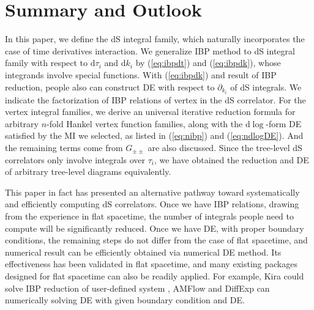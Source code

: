 \documentclass[a4paper,11pt]{article}
\newcommand{\nd}{\mathrm{d}}
\def\eqref#1{(\ref{#1})}
\begin{document}




\section{Summary and Outlook}\label{sec:4}
In this paper, we define the dS integral family, which naturally incorporates the case of time derivatives interaction. We generalize IBP method to dS integral family with respect to $\nd \tau_i$ and $\nd k_i$ by \eqref{eq:ibpdt} and \eqref{eq:ibpdk}, whose integrands involve special functions. With \eqref{eq:ibpdk} and result of IBP reduction,  people also can construct DE with respect to $\partial_{k_i}$ of dS integrals. We indicate  the factorization of IBP relations of vertex in the dS correlator. For the vertex integral families, we derive an universal iterative reduction formula for arbitrary $n$-fold Hankel vertex function families, along with the $\nd \log$-form DE satisfied by the MI we selected, as listed in \eqref{eq:nibp} and \eqref{eq:ndlogDE}. And the remaining terms come from $G_{\pm\pm}$ are also discussed.  Since the tree-level dS correlators only involve integrals over $\tau_i$, we have obtained the reduction and DE of arbitrary tree-level diagrams %
equivalently.

This paper in fact has presented an alternative pathway toward systematically and efficiently computing dS correlators. Once we have IBP relations, drawing from the experience in flat spacetime, the number of integrals people need to compute will be significantly reduced. Once we have DE, with proper boundary conditions, the remaining steps do not differ from the case of flat spacetime, and numerical result can be efficiently obtained via numerical DE method.  Its effectiveness has been validated in flat spacetime, and many existing packages designed for flat spacetime can also be readily applied. For example, Kira could solve IBP reduction of user-defined system \cite{Maierhofer:2018gpa}, AMFlow \cite{Liu:2022chg} and DiffExp \cite{Hidding:2020ytt} can numerically solving DE with given boundary condition and DE.
\end{document}
